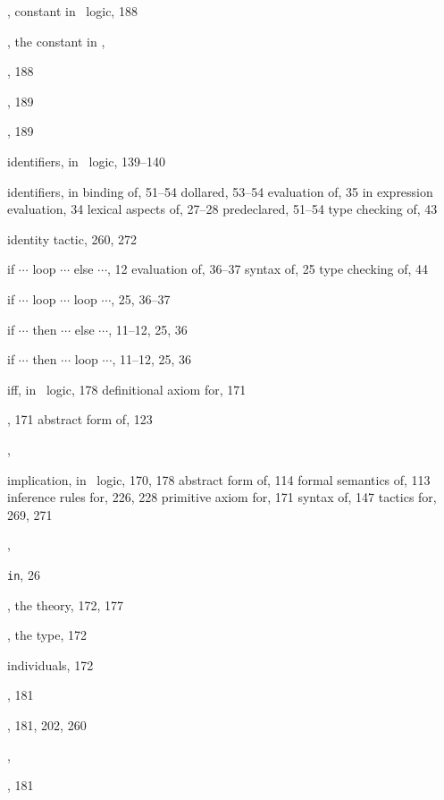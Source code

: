 \begin{theindex}
  \item {}, constant in \HOL\ logic, 188
  \item {}, the constant in \ML, 
  \item {}, 188
  \item {}, 189
  \item {}, 189
  \item identifiers, in \HOL\ logic, 139--140
  \item identifiers, in \ML
    \subitem binding of, 51--54
    \subitem dollared, 53--54
    \subitem evaluation of, 35
    \subitem in expression evaluation, 34
    \subitem lexical aspects of, 27--28
    \subitem predeclared, 51--54
    \subitem type checking of, 43
  \item identity tactic, 260, 272
  \item {\small if $\cdots$ loop $\cdots$ else $\cdots$}, 12
    \subitem evaluation of, 36--37
    \subitem syntax of, 25
    \subitem type checking of, 44
  \item {\small if $\cdots$ loop $\cdots$ loop $\cdots$}, 25, 36--37
  \item {\small if $\cdots$ then $\cdots$ else $\cdots$}, 11--12, 25, 
		36
  \item {\small if $\cdots$ then $\cdots$ loop $\cdots$}, 11--12, 25, 
		36
  \item iff, in \HOL\ logic, 178
    \subitem definitional axiom for, 171
  \item {}, 171
    \subitem abstract form of, 123
  \item {}, 
  \item implication, in \HOL\ logic, 170, 178
    \subitem abstract form of, 114
    \subitem formal semantics of, 113
    \subitem inference rules for, 226, 228
    \subitem primitive axiom for, 171
    \subitem syntax of, 147
    \subitem tactics for, 269, 271
  \item {}, 
  \item {\small\verb+in+}, 26
  \item {}, the theory, 172, 177
  \item {}, the type, 172
  \item individuals, 172
  \item {}, 181
  \item {}, 181, 202, 260
  \item {}, 
  \item {}, 181

\end{theindex}
